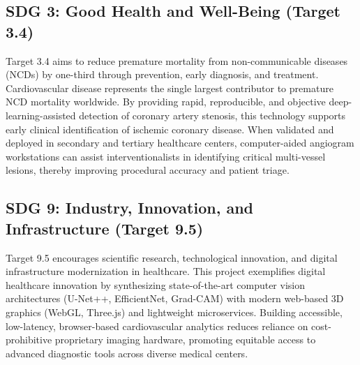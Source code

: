 \subsection{SDG 3: Good Health and Well-Being (Target 3.4)}
Target 3.4 aims to reduce premature mortality from non-communicable diseases (NCDs) by one-third through prevention, early diagnosis, and treatment. Cardiovascular disease represents the single largest contributor to premature NCD mortality worldwide. By providing rapid, reproducible, and objective deep-learning-assisted detection of coronary artery stenosis, this technology supports early clinical identification of ischemic coronary disease. When validated and deployed in secondary and tertiary healthcare centers, computer-aided angiogram workstations can assist interventionalists in identifying critical multi-vessel lesions, thereby improving procedural accuracy and patient triage.

\subsection{SDG 9: Industry, Innovation, and Infrastructure (Target 9.5)}
Target 9.5 encourages scientific research, technological innovation, and digital infrastructure modernization in healthcare. This project exemplifies digital healthcare innovation by synthesizing state-of-the-art computer vision architectures (U-Net++, EfficientNet, Grad-CAM) with modern web-based 3D graphics (WebGL, Three.js) and lightweight microservices. Building accessible, low-latency, browser-based cardiovascular analytics reduces reliance on cost-prohibitive proprietary imaging hardware, promoting equitable access to advanced diagnostic tools across diverse medical centers.
